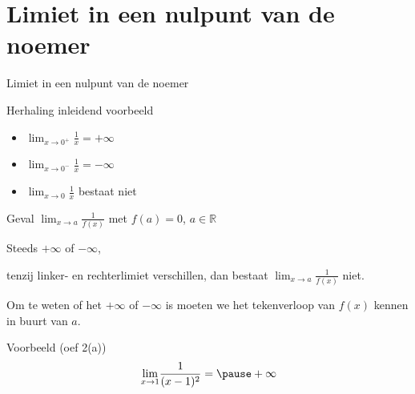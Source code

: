 \documentclass[handout]{beamer}
\begin{document}
\section{Limiet in een nulpunt van de noemer}
\begin{frame}{Limiet in een nulpunt van de noemer}
\begin{block}{Herhaling  inleidend voorbeeld}
\begin{itemize}
	\item $\displaystyle{\lim_{x  \to  0^+}} \frac 1x = +
\infty$
\item $\displaystyle{\lim_{x  \to  0^-}} \frac 1x = -
\infty$
\item $\displaystyle{\lim_{x \to  0}} \frac 1x$ bestaat niet
\end{itemize}
\end{block}
\end{frame}
\begin{frame}{Geval $\displaystyle{\lim_{x \rightarrow a}} \frac{1}{f(x)}$
met $f(a) = 0$, $a \in \mathbb{R}$}


Steeds $+ \infty$ of $- \infty$, 

tenzij
linker- en rechterlimiet verschillen, dan bestaat
$\displaystyle{\lim_{x \rightarrow a}} \frac 1{f(x)}$ niet.

Om te weten of het $+ \infty$ of $- \infty$ is moeten we het tekenverloop van
$f(x)$ kennen in buurt van $a$.
\end{frame}

\begin{frame}
\begin{exampleblock}{Voorbeeld (oef 2(a))}
$$\displaystyle{\lim_{x \rightarrow 1}} \frac {1}{(x-1)^2}= \pause + \infty$$
\end{exampleblock}
\end{frame}
\end{document}
